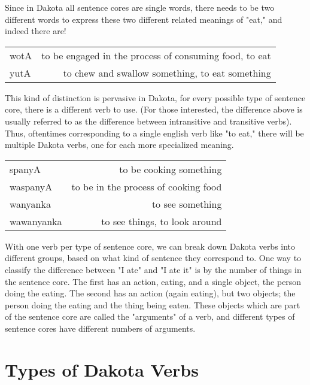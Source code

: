 \documentclass[10pt,letter]{article} %
\begin{document}
Since in Dakota all sentence cores are single words, there needs to be two different words to express these two different related meanings of "eat," and indeed there are!

\begin{center}
\begin{tabular}{ l r }
  wotA & to be engaged in the process of consuming food, to eat\\
  yutA & to chew and swallow something, to eat something \\
\end{tabular}
\end{center}

This kind of distinction is pervasive in Dakota, for every possible type of sentence core, there is a different verb to use.  (For those interested, the difference above is usually referred to as the difference between intransitive and transitive verbs).  Thus, oftentimes corresponding to a single english verb like "to eat," there will be multiple Dakota verbs, one for each more specialized meaning.

\begin{center}
\begin{tabular}{ l r }
  spanyA & to be cooking something\\
  waspanyA & to be in the process of cooking food \\
  wanyanka& to see something\\
  wawanyanka & to see things, to look around \\
\end{tabular}
\end{center}

With one verb per type of sentence core, we can break down Dakota verbs into different groups, based on what kind of sentence they correspond to.  One way to classify the difference between "I ate" and "I ate it" is by the number of things in the sentence core.  The first has an action, eating, and a single object, the person doing the eating.  The second has an action (again eating), but two objects; the person doing the eating and the thing being eaten.  These objects which are part of the sentence core are called the "arguments" of a verb, and different types of sentence cores have different numbers of arguments.



    \section{Types of Dakota Verbs}
\end{document}
